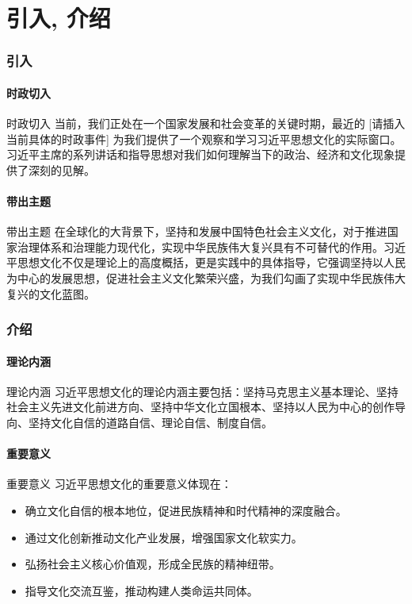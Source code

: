 \documentclass[xcolor=table,dvipsnames,svgnames,aspectratio=169]{ctexbeamer}
\begin{document}
% 
% 
% 
% 

\part{引入, 介绍}
\section{引入}
\subsection{时政切入}
\begin{frame}{时政切入}
  当前，我们正处在一个国家发展和社会变革的关键时期，最近的 [请插入当前具体的时政事件] 为我们提供了一个观察和学习习近平思想文化的实际窗口。习近平主席的系列讲话和指导思想对我们如何理解当下的政治、经济和文化现象提供了深刻的见解。
\end{frame}

\subsection{带出主题}
\begin{frame}{带出主题}
  在全球化的大背景下，坚持和发展中国特色社会主义文化，对于推进国家治理体系和治理能力现代化，实现中华民族伟大复兴具有不可替代的作用。习近平思想文化不仅是理论上的高度概括，更是实践中的具体指导，它强调坚持以人民为中心的发展思想，促进社会主义文化繁荣兴盛，为我们勾画了实现中华民族伟大复兴的文化蓝图。
\end{frame}

\section{介绍}
\subsection{理论内涵}
\begin{frame}{理论内涵}
  习近平思想文化的理论内涵主要包括：坚持马克思主义基本理论、坚持社会主义先进文化前进方向、坚持中华文化立国根本、坚持以人民为中心的创作导向、坚持文化自信的道路自信、理论自信、制度自信。
\end{frame}

\subsection{重要意义}
\begin{frame}{重要意义}
  习近平思想文化的重要意义体现在：
  \begin{itemize}
    \item 确立文化自信的根本地位，促进民族精神和时代精神的深度融合。
    \item 通过文化创新推动文化产业发展，增强国家文化软实力。
    \item 弘扬社会主义核心价值观，形成全民族的精神纽带。
    \item 指导文化交流互鉴，推动构建人类命运共同体。
  \end{itemize}
\end{frame}
\end{document}
